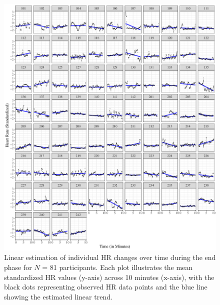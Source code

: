 \documentclass[preprint,
3p]{elsarticle} %
\begin{document}
\begin{figure}[htbp]
  \centering
  \includegraphics[width=1\textwidth]{plots_publication/plot_end_appendix.pdf}
    \caption{Linear estimation of individual HR changes over time during the end phase for $N$ = 81 participants. Each plot illustrates the mean standardized HR values (y-axis) across 10 minutes (x-axis), with the black dots representing observed HR data points and the blue line showing the estimated linear trend.}
  \label{fig.a7}
\end{figure}

\newpage


\end{document}
